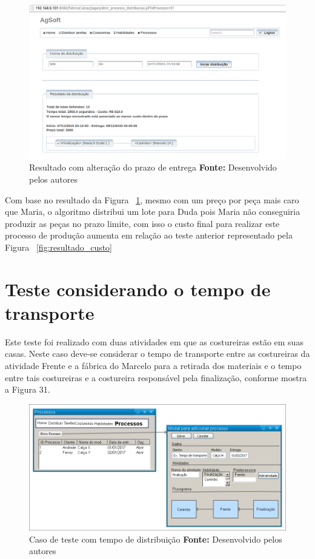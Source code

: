 \begin{figure}[h!]
	\centerline{\includegraphics[scale=0.4]{./imagens/resultado_alterando_prazo_entrega_teste2.png}}
	\caption[Resultado com alteração do prazo de entrega]
	{Resultado com alteração do prazo de entrega \textbf{Fonte:} Desenvolvido pelos autores}
	\label{fig:resultado_mudando_prazo_de_entrega}
\end{figure}

\par Com base no resultado da Figura
~\ref{fig:resultado_mudando_prazo_de_entrega}, mesmo com um preço por peça mais
caro que Maria, o algoritmo distribui um lote para Duda pois Maria não
conseguiria produzir as peças no prazo limite, com isso o custo final para
realizar este processo de produção aumenta em relação ao teste anterior
representado pela Figura ~\ref{fig:resultado_custo} 

\section{Teste considerando o tempo de transporte}
\par Este teste foi realizado com duas atividades em que as costureiras estão em suas casas. Neste caso deve-se considerar
o tempo de transporte entre as costureiras da atividade Frente e a fábrica do Marcelo para a retirada dos materiais e o tempo 
entre tais costureiras e a costureira responsável pela finalização, conforme
mostra a Figura 31.


\begin{figure}[h!]
	\centerline{\includegraphics[scale=0.3]{./imagens/test_case_2.png}}
	\caption[Caso de teste com tempo de distribuição]
	{Caso de teste com tempo de distribuição \textbf{Fonte:} Desenvolvido pelos autores}
	\label{fig:exemplo1}
\end{figure}


